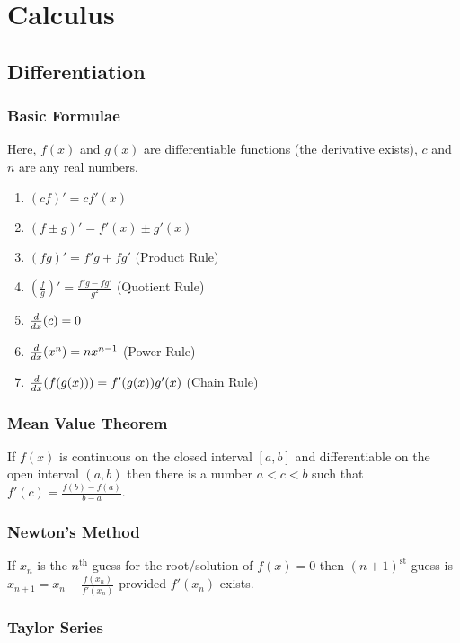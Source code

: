 \section{Calculus}
\label{section2.3}

\subsection{Differentiation}

\subsubsection*{Basic Formulae}

Here, $f(x)$ and $g(x)$ are differentiable functions (the derivative exists), $c$ and $n$ are any real numbers.
\begin{enumerate}
	\item $(cf)'=cf'(x)$
	\item $(f\pm g)'=f'(x)\pm g'(x)$
	\item $(fg)'=f'g+fg'$ (Product Rule)
	\item $(\frac{f}{g})'=\frac{f'g-fg'}{g^2}$ (Quotient Rule)
	\item $\frac{d}{dx}(c)=0$
	\item $\frac{d}{dx}(x^n)=nx^{n-1}$ (Power Rule)
	\item $\frac{d}{dx}(f(g(x)))=f'(g(x))g'(x)$ (Chain Rule)
\end{enumerate}

\subsubsection*{Mean Value Theorem}

If $f(x)$ is continuous on the closed interval $[a,b]$ and differentiable on the open interval $(a,b)$ then there is a number $a<c<b$ such that $f'(c)=\frac{f(b)-f(a)}{b-a}$.

\subsubsection*{Newton's Method}

If $x_n$ is the $n^\text{th}$ guess for the root/solution of $f(x)=0$ then $(n+1)^\text{st}$ guess is $x_{n+1}=x_n-\frac{f(x_n)}{f'(x_n)}$ provided $f'(x_n)$ exists.

\subsubsection*{Taylor Series}

